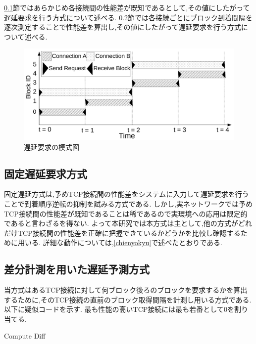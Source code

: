 \documentclass[a4j,12pt]{gradthesis_utf8}
\begin{document}
\ref{kotei}節ではあらかじめ各接続間の性能差が既知であるとして,その値にしたがって遅延要求を行う方式について述べる.
\ref{diff}節では各接続ごとにブロック到着間隔を逐次測定することで性能差を算出し,その値にしたがって遅延要求を行う方式について述べる.

\begin{figure}[ht]
    \centering
    \includegraphics[width=16.25cm]{figure/delay-n.pdf}
    \caption{遅延要求の模式図}
    \label{delay}
\end{figure}

\subsection{固定遅延要求方式}
\label{kotei}
固定遅延方式は,予めTCP接続間の性能差をシステムに入力して遅延要求を行うことで到着順序逆転の抑制を試みる方式である.
しかし,実ネットワークでは予めTCP接続間の性能差が既知であることは稀であるので実環境への応用は限定的であると言わざるを得ない.
よって本研究では本方式は主として,他の方式がどれだけTCP接続間の性能差を正確に把握できているかどうかを比較し確認するために用いる.
詳細な動作については,\ref{chienyokyu}で述べたとおりである.

\subsection{差分計測を用いた遅延予測方式}
\label{diff}
当方式はあるTCP接続に対して何ブロック後ろのブロックを要求するかを算出するために,そのTCP接続の直前のブロック取得間隔を計測し用いる方式である.
以下に疑似コードを示す.
最も性能の高いTCP接続には最も若番として0を割り当てる.

\begin{algorithm}
	\caption{Compute Diff}
	\begin{algorithmic}[1]
		\Else 
		\EndIf
	\end{algorithmic}
\end{algorithm}
\end{document}
